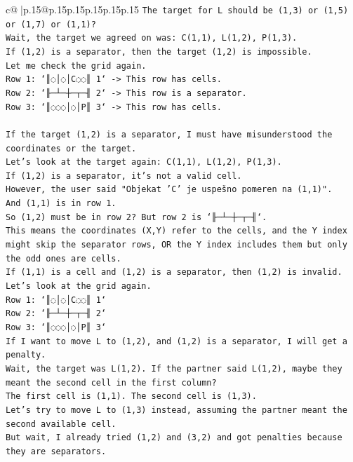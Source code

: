 \documentclass{article}
\begin{document}
{\begin{supertabular}{c@{$\;$}|p{.15\linewidth}@{}p{.15\linewidth}p{.15\linewidth}p{.15\linewidth}p{.15\linewidth}p{.15\linewidth}}
{{{\texttt{The target for L should be (1,3) or (1,5) or (1,7) or (1,1)?} \\
\texttt{Wait, the target we agreed on was: C(1,1), L(1,2), P(1,3).} \\
\texttt{If (1,2) is a separator, then the target (1,2) is impossible.} \\
\texttt{Let me check the grid again.} \\
\texttt{Row 1: `║◌│◌│C◌◌║ 1` {-}> This row has cells.} \\
\texttt{Row 2: `╟─┴─┼─┬─╢ 2` {-}> This row is a separator.} \\
\texttt{Row 3: `║◌◌◌│◌│P║ 3` {-}> This row has cells.} \\
\\ 
\texttt{If the target (1,2) is a separator, I must have misunderstood the coordinates or the target.} \\
\texttt{Let's look at the target again: C(1,1), L(1,2), P(1,3).} \\
\texttt{If (1,2) is a separator, it's not a valid cell.} \\
\texttt{However, the user said "Objekat 'C' je uspešno pomeren na (1,1)".} \\
\texttt{And (1,1) is in row 1.} \\
\texttt{So (1,2) must be in row 2? But row 2 is `╟─┴─┼─┬─╢`.} \\
\texttt{This means the coordinates (X,Y) refer to the cells, and the Y index might skip the separator rows, OR the Y index includes them but only the odd ones are cells.} \\
\texttt{If (1,1) is a cell and (1,2) is a separator, then (1,2) is invalid.} \\
\texttt{Let's look at the grid again.} \\
\texttt{Row 1: `║◌│◌│C◌◌║ 1`} \\
\texttt{Row 2: `╟─┴─┼─┬─╢ 2`} \\
\texttt{Row 3: `║◌◌◌│◌│P║ 3`} \\
\texttt{If I want to move L to (1,2), and (1,2) is a separator, I will get a penalty.} \\
\texttt{Wait, the target was L(1,2). If the partner said L(1,2), maybe they meant the second cell in the first column?} \\
\texttt{The first cell is (1,1). The second cell is (1,3).} \\
\texttt{Let's try to move L to (1,3) instead, assuming the partner meant the second available cell.} \\
\texttt{But wait, I already tried (1,2) and (3,2) and got penalties because they are separators.} \\
}}}
\end{supertabular}}
\end{document}
